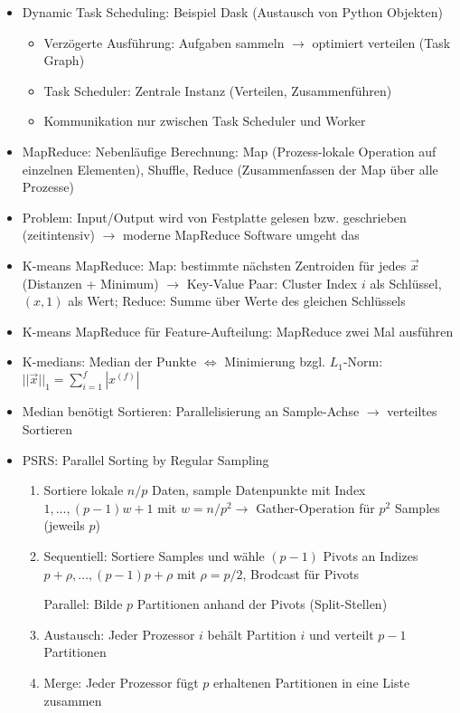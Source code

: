 \documentclass[11pt]{scrartcl}
\begin{document}
\begin{itemize}
\begin{itemize}
    \end{itemize}
    \item Dynamic Task Scheduling: Beispiel Dask (Austausch von Python Objekten)
    \begin{itemize}
        \item Verzögerte Ausführung: Aufgaben sammeln $\rightarrow$ optimiert verteilen (Task Graph)
        \item Task Scheduler: Zentrale Instanz (Verteilen, Zusammenführen)
        \item Kommunikation nur zwischen Task Scheduler und Worker
    \end{itemize}
    \item MapReduce: Nebenläufige Berechnung: Map (Prozess-lokale Operation auf 
    einzelnen Elementen), Shuffle, Reduce (Zusammenfassen der Map über alle Prozesse)
    \item Problem: Input/Output wird von Festplatte gelesen bzw. geschrieben (zeitintensiv)
    $\rightarrow$ moderne MapReduce Software umgeht das
    \item K-means MapReduce: Map: bestimmte nächsten Zentroiden für jedes $\vec{x}$ 
    (Distanzen + Minimum) $\rightarrow$ Key-Value Paar: Cluster Index $i$ als Schlüssel, $(x, 1)$
    als Wert; Reduce: Summe über Werte des gleichen Schlüssels
    \item K-means MapReduce für Feature-Aufteilung: MapReduce zwei Mal ausführen
    \item K-medians: Median der Punkte $\Leftrightarrow$ Minimierung bzgl. $L_1$-Norm: $||\vec{x}||_1 = \sum_{i=1}^f |x^{(f)}|$
    \item Median benötigt Sortieren: Parallelisierung an Sample-Achse $\rightarrow$ verteiltes Sortieren
    \item PSRS: Parallel Sorting by Regular Sampling
    \begin{enumerate}
        \item Sortiere lokale $n/p$ Daten, sample Datenpunkte mit Index 
        $1, \dots, (p - 1)w + 1$ mit $w = n / p^2 \rightarrow$ Gather-Operation für 
        $p^2$ Samples (jeweils $p$)
        \item Sequentiell: Sortiere Samples und wähle $(p - 1)$ Pivots an Indizes $p + \rho,
        \dots, (p - 1)p + \rho$ mit $\rho = p/2$, Brodcast für Pivots

        Parallel: Bilde $p$ Partitionen anhand der Pivots (Split-Stellen)
        \item Austausch: Jeder Prozessor $i$ behält Partition $i$ und verteilt $p - 1$ Partitionen
        \item Merge: Jeder Prozessor fügt $p$ erhaltenen Partitionen in eine Liste zusammen
        

\end{enumerate}
\end{itemize}
\end{document}

